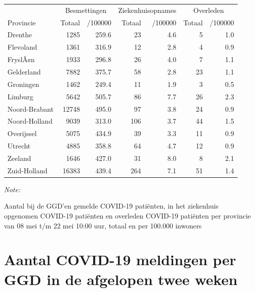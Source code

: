 \documentclass[
  english,
  man,floatsintext]{apa6}
\begin{document}
\begin{table}
\centering
\begin{threeparttable}
\begin{tabular}{lrrrrrr}
\toprule
\multicolumn{1}{c}{ } & \multicolumn{2}{c}{Besmettingen} & \multicolumn{2}{c}{Ziekenhuisopnames} & \multicolumn{2}{c}{Overleden} \\
\cmidrule(l{3pt}r{3pt}){2-3} \cmidrule(l{3pt}r{3pt}){4-5} \cmidrule(l{3pt}r{3pt}){6-7}
Provincie & Totaal & /100000 & Totaal & /100000 & Totaal & /100000\\
\midrule
Drenthe & 1285 & 259.6 & 23 & 4.6 & 5 & 1.0\\
Flevoland & 1361 & 316.9 & 12 & 2.8 & 4 & 0.9\\
FryslÃ¢n & 1933 & 296.8 & 26 & 4.0 & 7 & 1.1\\
Gelderland & 7882 & 375.7 & 58 & 2.8 & 23 & 1.1\\
Groningen & 1462 & 249.4 & 11 & 1.9 & 3 & 0.5\\
Limburg & 5642 & 505.7 & 86 & 7.7 & 26 & 2.3\\
Noord-Brabant & 12748 & 495.0 & 97 & 3.8 & 24 & 0.9\\
Noord-Holland & 9039 & 313.0 & 106 & 3.7 & 44 & 1.5\\
Overijssel & 5075 & 434.9 & 39 & 3.3 & 11 & 0.9\\
Utrecht & 4885 & 358.8 & 64 & 4.7 & 12 & 0.9\\
Zeeland & 1646 & 427.0 & 31 & 8.0 & 8 & 2.1\\
Zuid-Holland & 16383 & 439.4 & 264 & 7.1 & 51 & 1.4\\
\bottomrule
\end{tabular}
\begin{tablenotes}
\item \textit{Note: } 
\item Aantal bij de GGD’en gemelde COVID-19 patiënten, in het ziekenhuis opgenomen COVID-19 patiënten en overleden COVID-19 patiënten per provincie van 08 mei t/m 22 mei 10:00 uur, totaal en per 100.000 inwoners
\end{tablenotes}
\end{threeparttable}
\end{table}

\newpage

\hypertarget{aantal-covid-19-meldingen-per-ggd-in-de-afgelopen-twee-weken}{%
\section{Aantal COVID-19 meldingen per GGD in de afgelopen twee weken}\label{aantal-covid-19-meldingen-per-ggd-in-de-afgelopen-twee-weken}}
\end{document}

